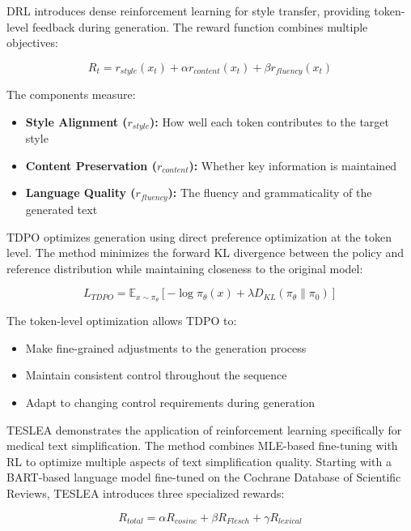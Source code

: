 DRL introduces dense reinforcement learning for style transfer, providing token-level feedback during generation. The reward function combines multiple objectives:

\begin{equation}
   R_t = r_{style}(x_t) + \alpha r_{content}(x_t) + \beta r_{fluency}(x_t)
\end{equation}

The components measure:
\begin{itemize}
   \item \textbf{Style Alignment ($r_{style}$):} How well each token contributes to the target style
   \item \textbf{Content Preservation ($r_{content}$):} Whether key information is maintained
   \item \textbf{Language Quality ($r_{fluency}$):} The fluency and grammaticality of the generated text
\end{itemize}

TDPO optimizes generation using direct preference optimization at the token level. The method minimizes the forward KL divergence between the policy and reference distribution while maintaining closeness to the original model:

\begin{equation}
   L_{TDPO} = \mathbb{E}_{x\sim\pi_\theta}[-\log\pi_\theta(x) + \lambda D_{KL}(\pi_\theta\|\pi_0)]
\end{equation}

The token-level optimization allows TDPO to:

\begin{itemize}
   \item Make fine-grained adjustments to the generation process
   \item Maintain consistent control throughout the sequence
   \item Adapt to changing control requirements during generation
\end{itemize}

TESLEA demonstrates the application of reinforcement learning specifically for medical text simplification. The method combines MLE-based fine-tuning with RL to optimize multiple aspects of text simplification quality. Starting with a BART-based language model fine-tuned on the Cochrane Database of Scientific Reviews, TESLEA introduces three specialized rewards:

\begin{equation}
    R_{total} = \alpha R_{cosine} + \beta R_{Flesch} + \gamma R_{lexical}
\end{equation}

